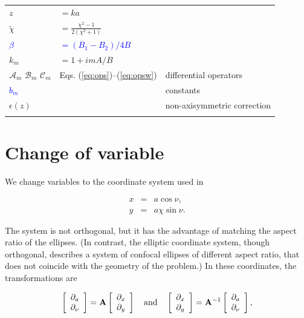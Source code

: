 \documentclass[apj]{emulateapj}
\newcommand{\vt}[1]{\mathbf{#1}}       %
\def\blue#1{\textcolor{blue}{#1}}
\newcommand{\Eqss}[2]{Eqs. (\ref{#1})--(\ref{#2})}
\newcommand{\eqss}[2]{\Eqss{#1}{#2}}
\newcommand{\beq}{\begin{equation}}
\newcommand{\eeq}{\end{equation}}
\newcommand{\beqn}{\begin{eqnarray}}
\newcommand{\eeqn}{\end{eqnarray}}
\newcommand{\tilchi}{\tilde\chi}
\begin{document}
\begin{table}
\begin{center}
\begin{tabular}{l l l}
$z$ & $=ka$ & \\
$\tilchi$ & $=\frac{\chi^2-1}{2(\chi^2+1)}$ & \\
\blue{$\beta$} & \blue{$=(B_1-B_2)/4B$}& \\
$k_m$ & $= 1+imA/B$ & \\
$\mathcal{A}_m$ $\mathcal{B}_m$ $\mathcal{C}_m$  &\eqss{eq:ops}{eq:opsw} & differential operators \\
\blue{$b_m$} & & constants\\
$\epsilon(z)$ & & non-axisymmetric correction \\
 & & \\ \hline
\end{tabular}
\end{center}
\end{table}


\section{Change of variable}
\label{sect:coordinate-transformation}

We change variables to the coordinate system used in \citet{Chang-Oishi10}

\beqn
  x &=& a \cos\nu, \label{eq:change-x}\\
  y &=& a\chi\sin\nu.  \label{eq:change-y}
\eeqn

The system is not orthogonal, but it has the advantage of matching the
aspect ratio of the ellipses. (In contrast, the elliptic coordinate
system, though orthogonal, describes a system of confocal ellipses of
different aspect ratio, that does not coincide with the geometry of
the problem.) In these coordinates, the transformations are 

\beq
\left[\begin{array}{c}
    \partial_{a}  \\
    \partial_{\nu}
  \end{array}\right] = \vt{A} 
  \left[\begin{array}{c}
      \partial_{x}  \\
      \partial_{y}
    \end{array}\right] 
%
\quad {\rm and} \quad 
%
\left[\begin{array}{c}
    \partial_{x}  \\
    \partial_{y}
  \end{array}\right] = \vt{A}^{-1} 
  \left[\begin{array}{c}
      \partial_{a}  \\
      \partial_{\nu}
    \end{array}\right],  
%
\eeq
\end{document}
